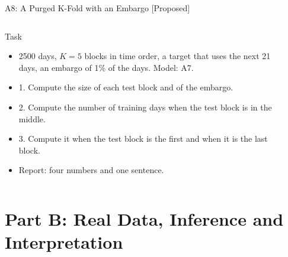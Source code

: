 \begin{frame}{A8: A Purged K-Fold with an Embargo [Proposed]}
\propsub
\itemsize{\scriptsize}
\begin{columns}[T]
\begin{column}{\taskw}
\begin{block}{Task}
\begin{itemize}
    \item 2500 days, $K = 5$ blocks in time order, a target that uses the next 21 days, an embargo of 1\% of the days. Model: A7.
    \item 1. Compute the size of each test block and of the embargo.
    \item 2. Compute the number of training days when the test block is in the middle.
    \item 3. Compute it when the test block is the first and when it is the last block.
    \item Report: four numbers and one sentence.
\end{itemize}
\end{block}
\end{column}
\begin{column}{\solw}
\end{column}
\end{columns}
\end{frame}


\section{Part B: Real Data, Inference and Interpretation}

